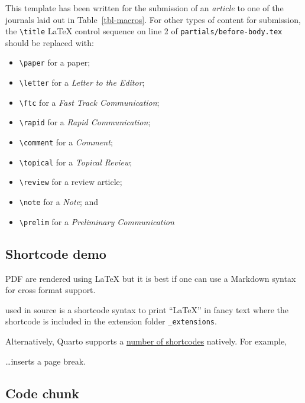 \documentclass[
  12pt]{iopart}
\providecommand{\tightlist}{%
  \setlength{\itemsep}{0pt}\setlength{\parskip}{0pt}}\usepackage{longtable,booktabs,array}
\begin{document}
This template has been written for the submission of an \emph{article}
to one of the journals laid out in Table~\ref{tbl-macros}. For other
types of content for submission, the \texttt{\textbackslash{}title}
{\LaTeX} control sequence on line 2 of \texttt{partials/before-body.tex}
should be replaced with:

\begin{itemize}
\tightlist
\item
  \texttt{\textbackslash{}paper} for a paper;
\item
  \texttt{\textbackslash{}letter} for a \emph{Letter to the Editor};
\item
  \texttt{\textbackslash{}ftc} for a \emph{Fast Track Communication};
\item
  \texttt{\textbackslash{}rapid} for a \emph{Rapid Communication};
\item
  \texttt{\textbackslash{}comment} for a \emph{Comment};
\item
  \texttt{\textbackslash{}topical} for a \emph{Topical Review};
\item
  \texttt{\textbackslash{}review} for a review article;
\item
  \texttt{\textbackslash{}note} for a \emph{Note}; and
\item
  \texttt{\textbackslash{}prelim} for a \emph{Preliminary Communication}
\end{itemize}

\subsection{Shortcode demo}\label{sec-shortcode}

PDF are rendered using {\LaTeX} but it is best if one can use a Markdown
syntax for cross format support.

{} used in source is a shortcode syntax to print ``LaTeX'' in fancy text
where the shortcode is included in the extension folder
\texttt{\_extensions}.

Alternatively, Quarto supports a
\href{https://quarto.org/docs/extensions/shortcodes.html}{number of
shortcodes} natively. For example, {}

\newpage{}

\ldots inserts a page break.

\subsection{Code chunk}\label{sec-chunks}
\end{document}
